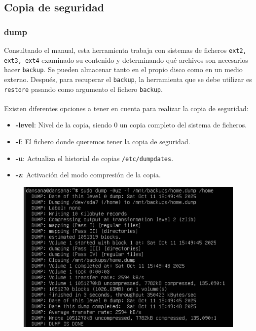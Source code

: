 \documentclass[10pt]{article}
\begin{document}
	\subsection{Copia de seguridad}
	\subsubsection{dump}
	Consultando el manual, esta herramienta trabaja con sistemas de ficheros \verb|ext2, ext3, ext4| examinado su contenido y determinando qué archivos son necesarios hacer \verb|backup|. Se pueden almacenar tanto en el propio disco como en un medio externo. Después, para recuperar el \verb|backup|, la herramienta que se debe utilizar es \verb|restore| pasando como argumento el fichero \verb|backup|.\\\\
	Existen diferentes opciones a tener en cuenta para realizar la copia de seguridad:
	\begin{itemize}
		\item \textbf{-level}: Nivel de la copia, siendo 0 un copia completo del sistema de ficheros.
		\item \textbf{-f}: El fichero donde queremos tener la copia de seguridad.
		\item \textbf{-u}: Actualiza el historial de copias \verb|/etc/dumpdates|.
		\item \textbf{-z}: Activación del modo compresión de la copia.
	\end{itemize}
	\begin{figure}[H]
		\setlength{\abovecaptionskip}{0cm}
		\setlength{\belowcaptionskip}{0cm}
		\centering
		\includegraphics[width=0.6\linewidth]{Recursos/dump.png}
	\end{figure}
	
\end{document}
